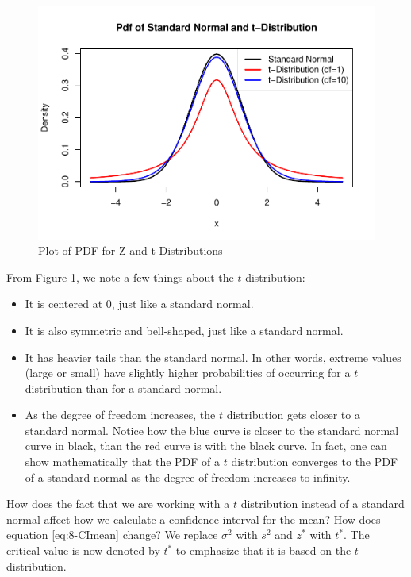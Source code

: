 \documentclass[
]{book}
\providecommand{\tightlist}{%
  \setlength{\itemsep}{0pt}\setlength{\parskip}{0pt}}
\begin{document}
\begin{figure}
\centering
\includegraphics{bookdown-demo_files/figure-latex/8-t-1.pdf}
\caption{\label{fig:8-t}Plot of PDF for Z and t Distributions}
\end{figure}

From Figure \ref{fig:8-t}, we note a few things about the \(t\) distribution:

\begin{itemize}
\tightlist
\item
  It is centered at 0, just like a standard normal.
\item
  It is also symmetric and bell-shaped, just like a standard normal.
\item
  It has heavier tails than the standard normal. In other words, extreme values (large or small) have slightly higher probabilities of occurring for a \(t\) distribution than for a standard normal.
\item
  As the degree of freedom increases, the \(t\) distribution gets closer to a standard normal. Notice how the blue curve is closer to the standard normal curve in black, than the red curve is with the black curve. In fact, one can show mathematically that the PDF of a \(t\) distribution converges to the PDF of a standard normal as the degree of freedom increases to infinity.
\end{itemize}

How does the fact that we are working with a \(t\) distribution instead of a standard normal affect how we calculate a confidence interval for the mean? How does equation \eqref{eq:8-CImean} change? We replace \(\sigma^2\) with \(s^2\) and \(z^*\) with \(t^*\). The critical value is now denoted by \(t^*\) to emphasize that it is based on the \(t\) distribution.
\end{document}
